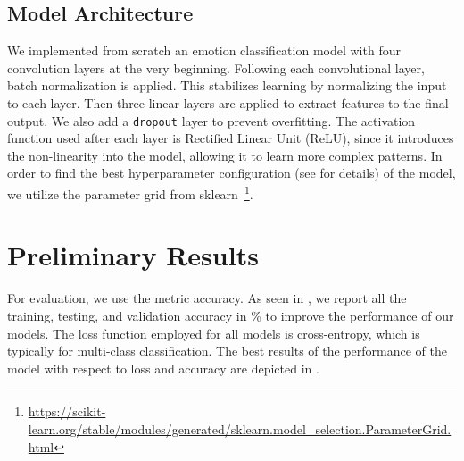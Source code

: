 \subsection{Model Architecture}
We implemented from scratch an emotion classification model with four convolution layers at the very beginning. 
Following each convolutional layer, 
batch normalization is applied. 
This stabilizes learning by normalizing the input to each layer. 
Then three linear layers are applied to extract features to the final output. 
We also add a \texttt{dropout} layer to prevent overfitting. 
The activation function used after each layer is Rectified Linear Unit (ReLU), 
since it introduces the non-linearity into the model, 
allowing it to learn more complex patterns. 
In order to find the best hyperparameter configuration (see  for details) of the model, 
we utilize the parameter grid from sklearn~\footnote{\url{https://scikit-learn.org/stable/modules/generated/sklearn.model_selection.ParameterGrid.html}}. 


\section{Preliminary Results}
\label{sec:result}

For evaluation, we use the metric accuracy. 
As seen in , 
we report all the training, testing, and validation accuracy in \% to improve the performance of our models. 
The loss function employed for all models is cross-entropy, which is typically for multi-class classification. 
The best results of the performance of the model with respect to loss and accuracy are depicted in .

\begin{table}
  \centering
  \caption{Accuracy (\%) for different models in our experiments}
  \label{tab:model}
\end{table}

